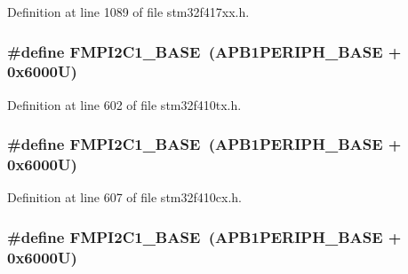 Definition at line 1089 of file stm32f417xx.\+h.

\subsubsection[{\texorpdfstring{F\+M\+P\+I2\+C1\+\_\+\+B\+A\+SE}{FMPI2C1_BASE}}]{\setlength{\rightskip}{0pt plus 5cm}\#define F\+M\+P\+I2\+C1\+\_\+\+B\+A\+SE~({\bf A\+P\+B1\+P\+E\+R\+I\+P\+H\+\_\+\+B\+A\+SE} + 0x6000\+U)}\hypertarget{group___peripheral__registers__structures_gac6e36f905b89086de0fceda4325a9a8e}{}\label{group___peripheral__registers__structures_gac6e36f905b89086de0fceda4325a9a8e}


Definition at line 602 of file stm32f410tx.\+h.

\subsubsection[{\texorpdfstring{F\+M\+P\+I2\+C1\+\_\+\+B\+A\+SE}{FMPI2C1_BASE}}]{\setlength{\rightskip}{0pt plus 5cm}\#define F\+M\+P\+I2\+C1\+\_\+\+B\+A\+SE~({\bf A\+P\+B1\+P\+E\+R\+I\+P\+H\+\_\+\+B\+A\+SE} + 0x6000\+U)}\hypertarget{group___peripheral__registers__structures_gac6e36f905b89086de0fceda4325a9a8e}{}\label{group___peripheral__registers__structures_gac6e36f905b89086de0fceda4325a9a8e}


Definition at line 607 of file stm32f410cx.\+h.

\subsubsection[{\texorpdfstring{F\+M\+P\+I2\+C1\+\_\+\+B\+A\+SE}{FMPI2C1_BASE}}]{\setlength{\rightskip}{0pt plus 5cm}\#define F\+M\+P\+I2\+C1\+\_\+\+B\+A\+SE~({\bf A\+P\+B1\+P\+E\+R\+I\+P\+H\+\_\+\+B\+A\+SE} + 0x6000\+U)}\hypertarget{group___peripheral__registers__structures_gac6e36f905b89086de0fceda4325a9a8e}{}\label{group___peripheral__registers__structures_gac6e36f905b89086de0fceda4325a9a8e}


